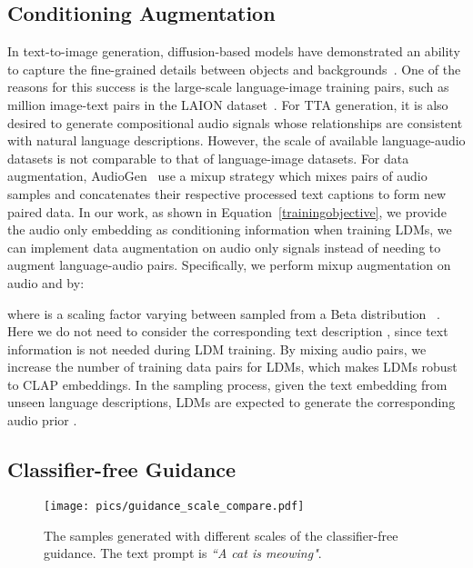 \documentclass{article}
\begin{document}
\subsection{Conditioning Augmentation}
\label{CA}

In text-to-image generation, diffusion-based models have demonstrated an ability to capture the fine-grained details between objects and backgrounds~\cite{DALLE2,Imagen,CompositionalDDPM}. One of the reasons for this success is the large-scale language-image training pairs, such as  million image-text pairs in the LAION dataset~\cite{schuhmann2021laion}. For TTA generation, it is also desired to generate compositional audio signals whose relationships are consistent with natural language descriptions. However, the scale of available language-audio datasets is not comparable to that of language-image datasets. For data augmentation, AudioGen~\cite{kreuk2022audiogen} use a mixup strategy which mixes pairs of audio samples and concatenates their respective processed text captions to form new paired data. In our work, as shown in Equation~\ref{trainingobjective}, we provide the audio only embedding  as conditioning information when training LDMs, we can implement data augmentation on audio only signals instead of needing to augment language-audio pairs. Specifically, we perform mixup augmentation on audio  and  by:  

where  is a scaling factor varying between  sampled from a Beta distribution ~\cite{gong2021psla}. Here we do not need to consider the corresponding text description , since text information is not needed during LDM training. By mixing audio pairs, we increase the number of training data pairs  for LDMs, which makes LDMs robust to CLAP embeddings. In the sampling process, given the text embedding  from unseen language descriptions, LDMs are expected to generate the corresponding audio prior .

\subsection{Classifier-free Guidance}
\label{CFG}

\begin{figure}[htbp]
    \centering
    \texttt{[image: pics/guidance\_scale\_compare.pdf]}
    \caption{The samples generated with different scales of the classifier-free guidance. The text prompt is \textit{``A cat is meowing"}.}
    \label{fig:my_label}
\end{figure}
\end{document}
